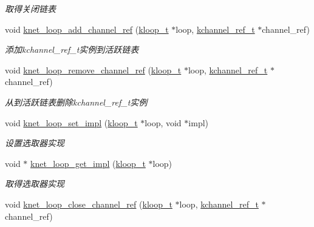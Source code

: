 \begin{DoxyCompactItemize}
\begin{DoxyCompactList}\small\item\em 取得关闭链表 \end{DoxyCompactList}\item 
void \hyperlink{a00076_a59174eaaecf0028aeac92d919acb6cd7_a59174eaaecf0028aeac92d919acb6cd7}{knet\+\_\+loop\+\_\+add\+\_\+channel\+\_\+ref} (\hyperlink{a00056_a97fc76209a58362019f1ded9169e397f_a97fc76209a58362019f1ded9169e397f}{kloop\+\_\+t} $\ast$loop, \hyperlink{a00056_a3b7e82599367eade261456f60ebe2cd9_a3b7e82599367eade261456f60ebe2cd9}{kchannel\+\_\+ref\+\_\+t} $\ast$channel\+\_\+ref)
\begin{DoxyCompactList}\small\item\em 添加kchannel\+\_\+ref\+\_\+t实例到活跃链表 \end{DoxyCompactList}\item 
void \hyperlink{a00076_a5f2c16d159cea62a75e2d07927a346bd_a5f2c16d159cea62a75e2d07927a346bd}{knet\+\_\+loop\+\_\+remove\+\_\+channel\+\_\+ref} (\hyperlink{a00056_a97fc76209a58362019f1ded9169e397f_a97fc76209a58362019f1ded9169e397f}{kloop\+\_\+t} $\ast$loop, \hyperlink{a00056_a3b7e82599367eade261456f60ebe2cd9_a3b7e82599367eade261456f60ebe2cd9}{kchannel\+\_\+ref\+\_\+t} $\ast$channel\+\_\+ref)
\begin{DoxyCompactList}\small\item\em 从到活跃链表删除kchannel\+\_\+ref\+\_\+t实例 \end{DoxyCompactList}\item 
void \hyperlink{a00076_a24e13537994fbbf0920a20064f4d0d63_a24e13537994fbbf0920a20064f4d0d63}{knet\+\_\+loop\+\_\+set\+\_\+impl} (\hyperlink{a00056_a97fc76209a58362019f1ded9169e397f_a97fc76209a58362019f1ded9169e397f}{kloop\+\_\+t} $\ast$loop, void $\ast$impl)
\begin{DoxyCompactList}\small\item\em 设置选取器实现 \end{DoxyCompactList}\item 
void $\ast$ \hyperlink{a00076_a7692aa019b3ad845242804e7633b4849_a7692aa019b3ad845242804e7633b4849}{knet\+\_\+loop\+\_\+get\+\_\+impl} (\hyperlink{a00056_a97fc76209a58362019f1ded9169e397f_a97fc76209a58362019f1ded9169e397f}{kloop\+\_\+t} $\ast$loop)
\begin{DoxyCompactList}\small\item\em 取得选取器实现 \end{DoxyCompactList}\item 
void \hyperlink{a00076_ad0afd1d89a38d015b3b28127a1e7dce4_ad0afd1d89a38d015b3b28127a1e7dce4}{knet\+\_\+loop\+\_\+close\+\_\+channel\+\_\+ref} (\hyperlink{a00056_a97fc76209a58362019f1ded9169e397f_a97fc76209a58362019f1ded9169e397f}{kloop\+\_\+t} $\ast$loop, \hyperlink{a00056_a3b7e82599367eade261456f60ebe2cd9_a3b7e82599367eade261456f60ebe2cd9}{kchannel\+\_\+ref\+\_\+t} $\ast$channel\+\_\+ref)

\end{DoxyCompactItemize}
